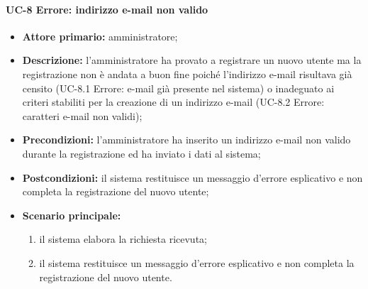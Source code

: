 \paragraph{UC-8 Errore: indirizzo e-mail non valido}
\begin{itemize}
	\item \textbf{Attore primario:} amministratore;

	\item \textbf{Descrizione:} l'amministratore ha provato a registrare un nuovo utente ma la registrazione non è andata a buon fine poiché l'indirizzo e-mail risultava già censito (UC-8.1 Errore: e-mail già presente nel sistema) o inadeguato ai criteri stabiliti per la creazione di un indirizzo e-mail (UC-8.2 Errore: caratteri e-mail non validi);

	\item \textbf{Precondizioni:} l'amministratore ha inserito un indirizzo e-mail non valido durante la registrazione ed ha inviato i dati al sistema;

	\item \textbf{Postcondizioni:} il sistema restituisce un messaggio d'errore esplicativo e non completa la registrazione del nuovo utente;

	\item \textbf{Scenario principale:}
	      \begin{enumerate}
		      \item il sistema elabora la richiesta ricevuta;
		      \item il sistema restituisce un messaggio d'errore esplicativo e non completa la registrazione del nuovo utente.
	      \end{enumerate}
\end{itemize}

